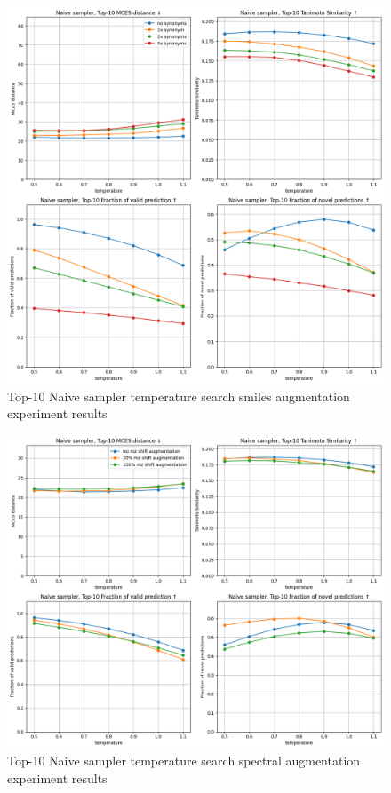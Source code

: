 \begin{figure}[h]
    \centering
    \includegraphics[width=1.0\textwidth]{figures/appendix/smiles_augmentation_with_tanimoto.png}
    \caption{Top-10 Naive sampler temperature search smiles augmentation experiment results}
    \label{fig:smiles_augmentation_appendix}
\end{figure}

\begin{figure}[h]
    \centering
    \includegraphics[width=1.0\textwidth]{figures/appendix/spectal_augmentation_with_tanimoto.png}
    \caption{Top-10 Naive sampler temperature search spectral augmentation experiment results}
    \label{fig:spectral_augmentation_appendix}
\end{figure}

